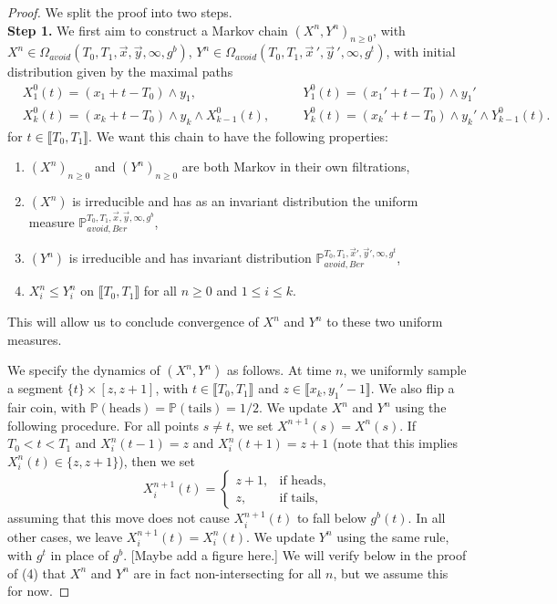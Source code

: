 \begin{proof} We split the proof into two steps.\\
	
	\noindent\textbf{Step 1.} We first aim to construct a Markov chain $(X^n,Y^n)_{n\geq 0}$, with \\$X^n\in \Omega_{avoid}(T_0,T_1,\vec{x},\vec{y},\infty,g^b)$, $Y^n\in \Omega_{avoid}(T_0,T_1,\vec{x}\,',\vec{y}\,',\infty,g^t)$, with initial distribution given by the maximal paths
	\begin{align*}
	& X^0_1(t)=(x_1+t-T_0) \wedge y_1,\quad && Y^0_1(t)=(x_1'+t-T_0) \wedge y_1'\\
	& X^0_k(t)=(x_k+t-T_0) \wedge y_k \wedge X^0_{k-1}(t), \quad && Y^0_k(t)=(x_k'+t-T_0) \wedge y_k' \wedge Y^0_{k-1}(t).
	\end{align*}
	for $t\in\llbracket T_0, T_1\rrbracket$. We want this chain to have the following properties: 
	\begin{enumerate}[label=(\arabic*)]
		
		\item $(X^n)_{n\geq 0}$ and $(Y^n)_{n\geq 0}$ are both Markov in their own filtrations,
		
		\item $(X^n)$ is irreducible and has as an invariant distribution the uniform measure $\mathbb{P}_{avoid,Ber}^{T_0,T_1,\vec{x},\vec{y},\infty,g^b}$,
		
		\item $(Y^n)$ is irreducible and has invariant distribution $\mathbb{P}_{avoid,Ber}^{T_0,T_1,\vec{x}',\vec{y}',\infty,g^t}$,
		
		\item $X^n_i\leq Y^n_i$ on $\llbracket T_0, T_1\rrbracket$ for all $n\geq 0$ and $1\leq i \leq k$.
		
	\end{enumerate}
	
	\noindent This will allow us to conclude convergence of $X^n$ and $Y^n$ to these two uniform measures.
	
	We specify the dynamics of $(X^n, Y^n)$ as follows. At time $n$, we uniformly sample a segment $\{t\}\times[z, z+1]$, with $t\in\llbracket T_0, T_1\rrbracket$ and $z\in\llbracket x_k,y_1'-1\rrbracket$. We also flip a fair coin, with $\mathbb{P}(\textrm{heads})=\mathbb{P}(\textrm{tails})=1/2$. We update $X^n$ and $Y^n$ using the following procedure. For all points $s\neq t$, we set $X^{n+1}(s) = X^n(s)$. If $T_0 < t < T_1$ and $X^n_i(t-1)=z$ and $X^n_i(t+1)=z+1$ (note that this implies $X^n_i(t)\in\{z,z+1\}$), then we set
	\[
	X^{n+1}_i(t) = \begin{cases}
	z+1, & \textrm{if heads},\\
	z, & \textrm{if tails},
	\end{cases}
	\]
	assuming that this move does not cause $X^{n+1}_i(t)$ to fall below $g^b(t)$. In all other cases, we leave $X^{n+1}_i(t)=X^n_i(t)$. We update $Y^n$ using the same rule, with $g^t$ in place of $g^b$. [Maybe add a figure here.] We will verify below in the proof of (4) that $X^n$ and $Y^n$ are in fact non-intersecting for all $n$, but we assume this for now.
	

\end{proof}
